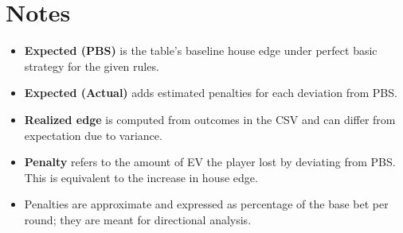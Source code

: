 \documentclass[11pt]{article}
\begin{document}
\section*{Notes}
\begin{itemize}
  \item \textbf{Expected (PBS)} is the table’s baseline house edge under perfect basic strategy for the given rules.
  \item \textbf{Expected (Actual)} adds estimated penalties for each deviation from PBS.
  \item \textbf{Realized edge} is computed from outcomes in the CSV and can differ from expectation due to variance.
  \item \textbf{Penalty} refers to the amount of EV the player lost by deviating from PBS. This is equivalent to the increase in house edge.
  \item Penalties are approximate and expressed as percentage of the base bet per round; they are meant for directional analysis.
\end{itemize}
\end{document}
